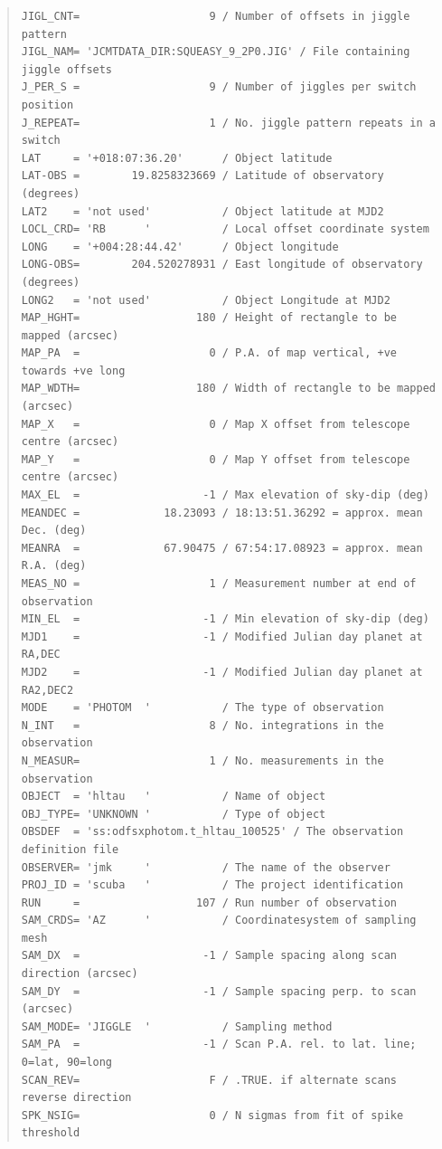 \documentclass[twoside,11pt]{article}
\newenvironment{myquote}{\begin{quote}\begin{small}}{\end{small}\end{quote}}
\renewcommand{\_}{\texttt{\symbol{95}}}
\begin{document}
\begin{myquote}
\begin{verbatim}
JIGL_CNT=                    9 / Number of offsets in jiggle pattern
JIGL_NAM= 'JCMTDATA_DIR:SQUEASY_9_2P0.JIG' / File containing jiggle offsets
J_PER_S =                    9 / Number of jiggles per switch position
J_REPEAT=                    1 / No. jiggle pattern repeats in a switch
LAT     = '+018:07:36.20'      / Object latitude
LAT-OBS =        19.8258323669 / Latitude of observatory (degrees)
LAT2    = 'not used'           / Object latitude at MJD2
LOCL_CRD= 'RB      '           / Local offset coordinate system
LONG    = '+004:28:44.42'      / Object longitude
LONG-OBS=        204.520278931 / East longitude of observatory (degrees)
LONG2   = 'not used'           / Object Longitude at MJD2
MAP_HGHT=                  180 / Height of rectangle to be mapped (arcsec)
MAP_PA  =                    0 / P.A. of map vertical, +ve towards +ve long
MAP_WDTH=                  180 / Width of rectangle to be mapped (arcsec)
MAP_X   =                    0 / Map X offset from telescope centre (arcsec)
MAP_Y   =                    0 / Map Y offset from telescope centre (arcsec)
MAX_EL  =                   -1 / Max elevation of sky-dip (deg)
MEANDEC =             18.23093 / 18:13:51.36292 = approx. mean Dec. (deg)
MEANRA  =             67.90475 / 67:54:17.08923 = approx. mean R.A. (deg)
MEAS_NO =                    1 / Measurement number at end of observation
MIN_EL  =                   -1 / Min elevation of sky-dip (deg)
MJD1    =                   -1 / Modified Julian day planet at RA,DEC
MJD2    =                   -1 / Modified Julian day planet at RA2,DEC2
MODE    = 'PHOTOM  '           / The type of observation
N_INT   =                    8 / No. integrations in the observation
N_MEASUR=                    1 / No. measurements in the observation
OBJECT  = 'hltau   '           / Name of object
OBJ_TYPE= 'UNKNOWN '           / Type of object
OBSDEF  = 'ss:odfsxphotom.t_hltau_100525' / The observation definition file
OBSERVER= 'jmk     '           / The name of the observer
PROJ_ID = 'scuba   '           / The project identification
RUN     =                  107 / Run number of observation
SAM_CRDS= 'AZ      '           / Coordinatesystem of sampling mesh
SAM_DX  =                   -1 / Sample spacing along scan direction (arcsec)
SAM_DY  =                   -1 / Sample spacing perp. to scan (arcsec)
SAM_MODE= 'JIGGLE  '           / Sampling method
SAM_PA  =                   -1 / Scan P.A. rel. to lat. line; 0=lat, 90=long
SCAN_REV=                    F / .TRUE. if alternate scans reverse direction
SPK_NSIG=                    0 / N sigmas from fit of spike threshold

\end{verbatim}
\end{myquote}
\end{document}
